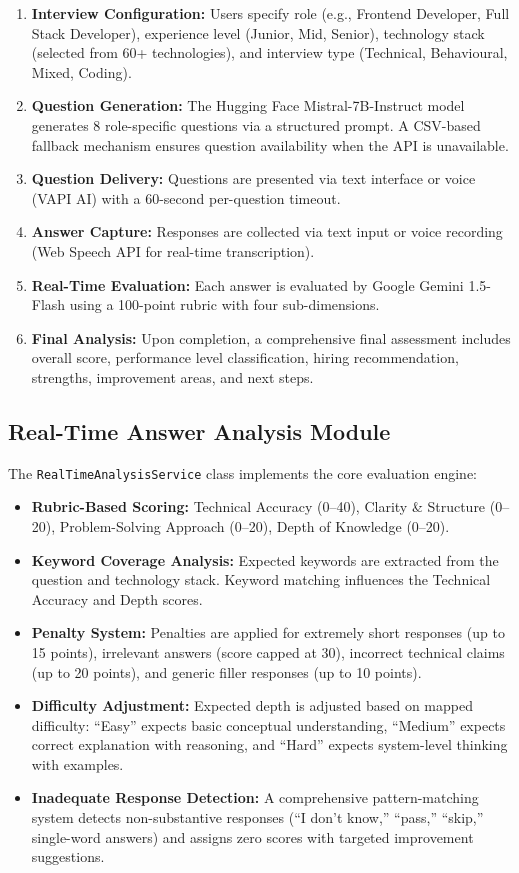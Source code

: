 \documentclass[12pt,a4paper,oneside]{report}
\begin{document}
\begin{enumerate}
  \item \textbf{Interview Configuration:} Users specify role (e.g., Frontend Developer, Full Stack Developer), experience level (Junior, Mid, Senior), technology stack (selected from 60+ technologies), and interview type (Technical, Behavioural, Mixed, Coding).
  \item \textbf{Question Generation:} The Hugging Face Mistral-7B-Instruct model generates 8 role-specific questions via a structured prompt. A CSV-based fallback mechanism ensures question availability when the API is unavailable.
  \item \textbf{Question Delivery:} Questions are presented via text interface or voice (VAPI AI) with a 60-second per-question timeout.
  \item \textbf{Answer Capture:} Responses are collected via text input or voice recording (Web Speech API for real-time transcription).
  \item \textbf{Real-Time Evaluation:} Each answer is evaluated by Google Gemini 1.5-Flash using a 100-point rubric with four sub-dimensions.
  \item \textbf{Final Analysis:} Upon completion, a comprehensive final assessment includes overall score, performance level classification, hiring recommendation, strengths, improvement areas, and next steps.
\end{enumerate}

\subsection{Real-Time Answer Analysis Module}
The \texttt{RealTimeAnalysisService} class implements the core evaluation engine:

\begin{itemize}
  \item \textbf{Rubric-Based Scoring:} Technical Accuracy (0--40), Clarity \& Structure (0--20), Problem-Solving Approach (0--20), Depth of Knowledge (0--20).
  \item \textbf{Keyword Coverage Analysis:} Expected keywords are extracted from the question and technology stack. Keyword matching influences the Technical Accuracy and Depth scores.
  \item \textbf{Penalty System:} Penalties are applied for extremely short responses (up to 15 points), irrelevant answers (score capped at 30), incorrect technical claims (up to 20 points), and generic filler responses (up to 10 points).
  \item \textbf{Difficulty Adjustment:} Expected depth is adjusted based on mapped difficulty: ``Easy'' expects basic conceptual understanding, ``Medium'' expects correct explanation with reasoning, and ``Hard'' expects system-level thinking with examples.
  \item \textbf{Inadequate Response Detection:} A comprehensive pattern-matching system detects non-substantive responses (``I don't know,'' ``pass,'' ``skip,'' single-word answers) and assigns zero scores with targeted improvement suggestions.
\end{itemize}
\end{document}
